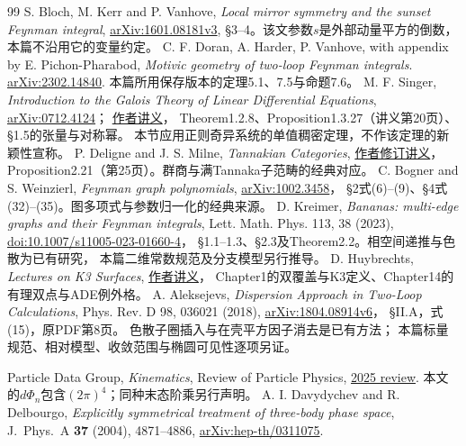 \documentclass[11pt,a4paper]{ctexart}
\theoremstyle{cnplain}\newtheorem{theorem}{定理}[section]
\theoremstyle{definition}\newtheorem{definition}[theorem]{定义}
\theoremstyle{remark}\newtheorem{remark}[theorem]{注}
\begin{document}
\begin{thebibliography}{99}
 S. Bloch, M. Kerr and P. Vanhove,
\emph{Local mirror symmetry and the sunset Feynman integral},
\href{https://arxiv.org/abs/1601.08181}{arXiv:1601.08181v3},
\S3--4。该文参数$s$是外部动量平方的倒数，本篇不沿用它的变量约定。
 C. F. Doran, A. Harder, P. Vanhove, with appendix by E. Pichon-Pharabod,
\emph{Motivic geometry of two-loop Feynman integrals}.
\href{https://arxiv.org/abs/2302.14840}{arXiv:2302.14840}.
本篇所用保存版本的定理5.1、7.5与命题7.6。
 M. F. Singer,
\emph{Introduction to the Galois Theory of Linear Differential Equations},
\href{https://arxiv.org/abs/0712.4124}{arXiv:0712.4124}；
\href{https://singer.math.ncsu.edu/papers/LMSlectures.pdf}{作者讲义}，
Theorem1.2.8、Proposition1.3.27（讲义第20页）、\S1.5的张量与对称幂。
本节应用正则奇异系统的单值稠密定理，不作该定理的新颖性宣称。
 P. Deligne and J. S. Milne,
\emph{Tannakian Categories},
\href{https://www.jmilne.org/math/xnotes/tc.pdf}{作者修订讲义}，
Proposition2.21（第25页）。群商与满Tannaka子范畴的经典对应。
 C. Bogner and S. Weinzierl,
\emph{Feynman graph polynomials},
\href{https://arxiv.org/abs/1002.3458}{arXiv:1002.3458}，
\S2式(6)--(9)、\S4式(32)--(35)。图多项式与参数归一化的经典来源。
 D. Kreimer,
\emph{Bananas: multi-edge graphs and their Feynman integrals},
Lett. Math. Phys. 113, 38 (2023),
\href{https://doi.org/10.1007/s11005-023-01660-4}{doi:10.1007/s11005-023-01660-4}，
\S1.1--1.3、\S2.3及Theorem2.2。相空间递推与色散为已有研究，
本篇二维常数规范及分支模型另行推导。
 D. Huybrechts, \emph{Lectures on K3 Surfaces},
\href{https://www.math.uni-bonn.de/people/huybrech/K3Global.pdf}{作者讲义}，
Chapter1的双覆盖与K3定义、Chapter14的有理双点与ADE例外格。
 A. Aleksejevs,
\emph{Dispersion Approach in Two-Loop Calculations},
Phys. Rev. D 98, 036021 (2018),
\href{https://arxiv.org/abs/1804.08914}{arXiv:1804.08914v6}，
\S II.A，式(15)，原PDF第8页。
色散子圈插入与在壳平方因子消去是已有方法；
本篇标量规范、相对模型、收敛范围与椭圆可见性逐项另证。

 Particle Data Group, \emph{Kinematics},
Review of Particle Physics,
\href{https://pdg.lbl.gov/2025/reviews/rpp2025-rev-kinematics.pdf}{2025 review}.
本文的$d\Phi_n$包含$(2\pi)^4$；同种末态阶乘另行声明。
 A. I. Davydychev and R. Delbourgo,
\emph{Explicitly symmetrical treatment of three-body phase space},
J.\ Phys.\ A \textbf{37} (2004), 4871--4886,
\href{https://arxiv.org/abs/hep-th/0311075}{arXiv:hep-th/0311075}.



\end{thebibliography}
\end{document}
